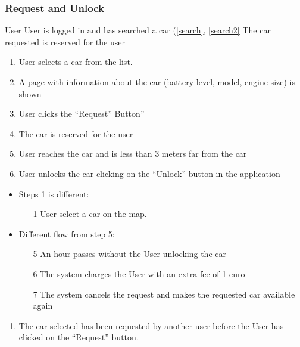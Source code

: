 \subsubsection{Request and Unlock}\label{request}
{User}
{ \newline {} \newline {}}
{User is logged in and has searched a car (\ref{search}, \ref{search2}}
{The car requested is reserved for the user}
{
\begin{enumerate}
	\item User selects a car from the list. 
	\item A page with information about the car (battery level, model, engine size) is shown
	\item User clicks the ``Request'' Button''
	\item The car is reserved for the user
	\item User reaches the car and is less than 3 meters far from the car
	\item User unlocks the car clicking on the ``Unlock'' button in the application

\end{enumerate}
}
{
\begin{itemize}
\item Steps 1 is different:
	\begin{enumerate}
	\item[1] User select a car on the map.   
	\end{enumerate}
\item Different flow from step 5:
	\begin{enumerate}
	\item[5] An hour passes without the User unlocking the car
	\item[6]The system charges the User with an extra fee of 1 euro
	\item [7]The system cancels the request and makes the requested car available again
	\end{enumerate}
\end{itemize}


}
{
\begin{enumerate}
\item The car selected has been requested by another user before the User has clicked on the ``Request'' button.
\end{enumerate}
}
\pagebreak


